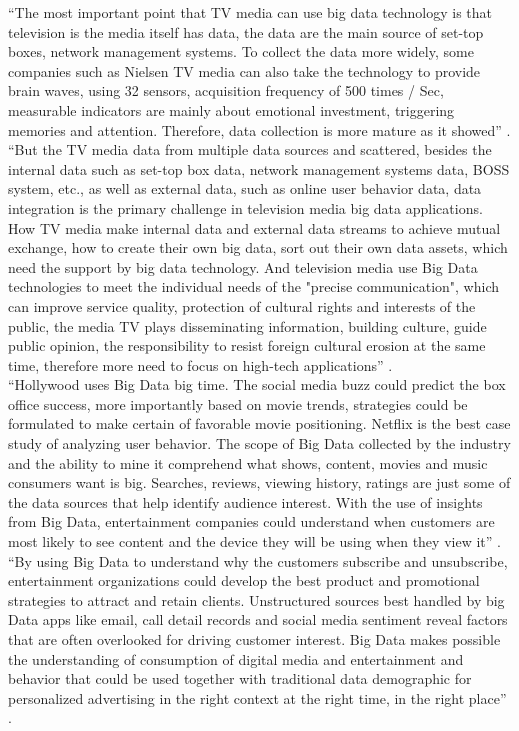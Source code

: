 \documentclass[sigconf]{acmart}
\begin{document}
``The most important point that TV media can use big data technology is that television is the media itself has data, the data are the main source of set-top boxes, network management systems. To collect the data more widely, some companies such as Nielsen TV media can also take the technology to provide brain waves, using 32 sensors, acquisition frequency of 500 times / Sec, measurable indicators are mainly about emotional investment, triggering memories and attention. Therefore, data collection is more mature as it showed'' \cite{Zhang2017era}. \\
``But the TV media data from multiple data sources and scattered, besides the internal data such as set-top box data, network management systems data, BOSS system, etc., as well as external data, such as online user behavior data, data integration is the primary challenge in television media big data applications. How TV media make internal data and external data streams to achieve mutual exchange, how to create their own big data, sort out their own data assets, which need the support by big data technology. And television media use Big Data technologies to meet the individual needs of the "precise communication", which can improve service quality, protection of cultural rights and interests of the public, the media TV plays disseminating information, building culture, guide public opinion, the responsibility to resist foreign cultural erosion at the same time, therefore more need to focus on high-tech applications'' \cite{Zhang2017era}. \\
``Hollywood uses Big Data big time. The social media buzz could predict the box office success, more importantly based on movie trends, strategies could be formulated to make certain of favorable movie positioning. Netflix is the best case study of analyzing user behavior. The scope of Big Data collected by the industry and the ability to mine it comprehend what shows, content, movies and music consumers want is big. Searches, reviews, viewing history, ratings are just some of the data sources that help identify audience interest. With the use of insights from Big Data, entertainment companies could understand when customers are most likely to see content and the device they will be using when they view it'' \cite{Mehta2017entertainment}. \\
``By using Big Data to understand why the customers subscribe and unsubscribe, entertainment organizations could develop the best product and promotional strategies to attract and retain clients. Unstructured sources best handled by big Data apps like email, call detail records and social media sentiment reveal factors that are often overlooked for driving customer interest. Big Data makes possible the understanding of consumption of digital media and entertainment and behavior that could be used together with traditional data demographic for personalized advertising in the right context at the right time, in the right place'' \cite{Mehta2017entertainment}. \\
\end{document}
